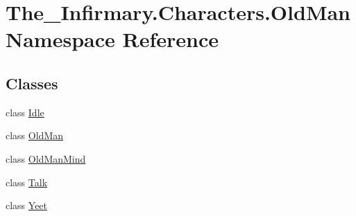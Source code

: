 \hypertarget{namespace_the___infirmary_1_1_characters_1_1_old_man}{}\section{The\+\_\+\+Infirmary.\+Characters.\+Old\+Man Namespace Reference}
\label{namespace_the___infirmary_1_1_characters_1_1_old_man}
\subsection*{Classes}
\begin{DoxyCompactItemize}
\item 
class \mbox{\hyperlink{class_the___infirmary_1_1_characters_1_1_old_man_1_1_idle}{Idle}}
\item 
class \mbox{\hyperlink{class_the___infirmary_1_1_characters_1_1_old_man_1_1_old_man}{Old\+Man}}
\item 
class \mbox{\hyperlink{class_the___infirmary_1_1_characters_1_1_old_man_1_1_old_man_mind}{Old\+Man\+Mind}}
\item 
class \mbox{\hyperlink{class_the___infirmary_1_1_characters_1_1_old_man_1_1_talk}{Talk}}
\item 
class \mbox{\hyperlink{class_the___infirmary_1_1_characters_1_1_old_man_1_1_yeet}{Yeet}}
\end{DoxyCompactItemize}
